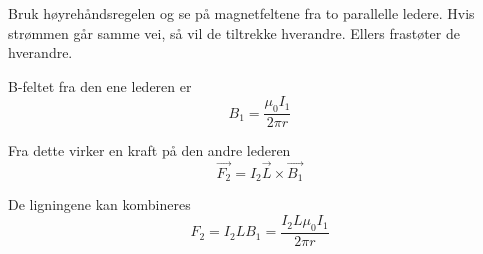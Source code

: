 Bruk høyrehåndsregelen og se på magnetfeltene fra to parallelle ledere.
Hvis strømmen går samme vei, så vil de tiltrekke hverandre.
Ellers frastøter de hverandre.

B-feltet fra den ene lederen er
$$B_1 = \frac{\mu_0I_1}{2\pi r}$$

Fra dette virker en kraft på den andre lederen
$$\vec{F_2} = I_2\vec{L}\times\vec{B_1}$$

De ligningene kan kombineres
$$F_2 = I_2 L B_1 = \frac{I_2 L \mu_0 I_1}{2\pi r}$$
